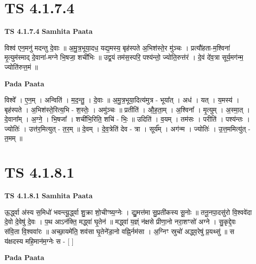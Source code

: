 \documentclass[17pt]{extarticle}
\begin{document}

\section{ TS 4.1.7.4 }

\textbf{TS 4.1.7.4 } \newline
\textbf{Samhita Paata} \newline

विश्व॑ एन॒मनु॑ मदन्तु दे॒वाः ॥ अ॒मु॒त्र॒भूया॒दध॒ यद्य॒मस्य॒ बृह॑स्पते अ॒भिश॑स्ते॒र मु॑ञ्चः । प्रत्यौ॑हता-म॒श्विना॑ मृ॒त्युम॑स्माद् दे॒वाना॑-मग्ने भि॒षजा॒ शची॑भिः ॥ उद्व॒यं तम॑स॒स्परि॒ पश्य॑न्तो॒ ज्योति॒रुत्त॑रं । दे॒वं दे॑व॒त्रा सूर्य॒मग॑न्म॒ ज्योति॑रुत्त॒मं ॥ \newline

\textbf{Pada Paata} \newline

विश्वे᳚ । ए॒न॒म् । अन्विति॑ । म॒द॒न्तु॒ । दे॒वाः ॥ अ॒मु॒त्र॒भूया॒दित्य॑मुत्र - भूया᳚त् । अध॑ । यत् । य॒मस्य॑ । बृह॑स्पते । अ॒भिश॑स्ते॒रित्य॒भि - श॒स्तेः॒ । अमु॑ञ्चः ॥ प्रतीति॑ । औ॒ह॒ता॒म् । अ॒श्विना᳚ । मृ॒त्युम् । अ॒स्मा॒त् । दे॒वाना᳚म् । अ॒ग्ने॒ । भि॒षजा᳚ । शची॑भि॒रिति॒ शचि॑ - भिः॒ ॥ उदिति॑ । व॒यम् । तम॑सः । परीति॑ । पश्य॑न्तः । ज्योतिः॑ । उत्त॑र॒मित्युत् - त॒र॒म् ॥ दे॒वम् । दे॒व॒त्रेति॑ देव - त्रा । सूर्य᳚म् । अग॑न्म । ज्योतिः॑ । उ॒त्त॒ममित्यु॑त् - त॒मम् ॥  \newline





\section{ TS 4.1.8.1 }

\textbf{TS 4.1.8.1 } \newline
\textbf{Samhita Paata} \newline

ऊ॒र्द्ध्वा अ॑स्य स॒मिधो॑ भवन्त्यू॒र्द्ध्वा शु॒क्रा शो॒चीꣳष्य॒ग्नेः । द्यु॒मत्त॑मा सु॒प्रती॑कस्य सू॒नोः ॥ तनू॒नपा॒दसु॑रो वि॒श्ववे॑दा दे॒वो दे॒वेषु॑ दे॒वः । प॒थ आऽन॑क्ति॒ मद्ध्वा॑ घृ॒तेन॑ ॥ मद्ध्वा॑ य॒ज्ञ्ं न॑क्षसे प्रीणा॒नो नरा॒शꣳसो॑ अग्ने । सु॒कृद्दे॒वः स॑वि॒ता वि॒श्ववा॑रः ॥ अच्छा॒यमे॑ति॒ शव॑सा घृ॒तेने॑डा॒नो वह्नि॒र्नम॑सा । अ॒ग्निꣳ स्रुचो॑ अद्ध्व॒रेषु॑ प्र॒यथ्सु॑ ॥ स य॑क्षदस्य महि॒मान॑म॒ग्नेः स - [  ] \newline

\textbf{Pada Paata} \newline
\end{document}
